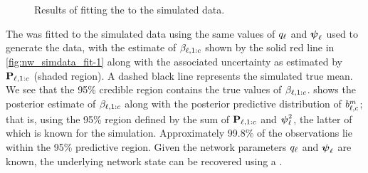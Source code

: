\begin{knitrout}\small
{}\color{fgcolor}\begin{figure}

{\centering {}\\
\\

}

\caption[Results of fitting the \kf{} to the simulated data]{Results of fitting the \kf{} to the simulated data.}\label{fig:nw_simdata_fit}
\end{figure}


\end{knitrout}

The \kf{} was fitted to the simulated data using the same values of $q_\ell$ and $\mathbf{\boldsymbol{\psi}}_\ell$ used to generate the data, with the estimate of $\beta_{\ell,1:c}$ shown by the solid red line in \cref{fig:nw_simdata_fit-1} along with the associated uncertainty as estimated by $\mathbf{P}_{\ell,1:c}$ (shaded region). A dashed black line represents the simulated true mean. We see that the 95\% credible region contains the true values of $\beta_{\ell,1:c}$.  shows the posterior estimate of $\beta_{\ell,1:c}$ along with the posterior predictive distribution of $b_{\ell,c}^m$; that is, using the 95\% region defined by the sum of $\mathbf{P}_{\ell,1:c}$ and $\mathbf{\boldsymbol{\psi}}_\ell^2$, the latter of which is known for the simulation. Approximately 99.8\% of the observations lie within the 95\% predictive region. Given the network parameters $q_\ell$ and $\mathbf{\boldsymbol{\psi}}_\ell$ are known, the underlying network state can be recovered using a \kf{}.


